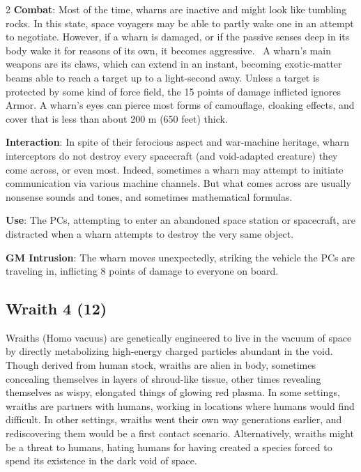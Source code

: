 \begin{multicols}{2}
\textbf{Combat}: Most of the time, wharns are inactive and might look like tumbling rocks. In this state, space voyagers may be able to partly wake one in an attempt to negotiate. However, if a wharn is damaged, or if the passive senses deep in its body wake it for reasons of its own, it becomes aggressive. 
A wharn’s main weapons are its claws, which can extend in an instant, becoming exotic-matter beams able to reach a target up to a light-second away. Unless a target is protected by some kind of force field, the 15 points of damage inflicted ignores Armor. A wharn’s eyes can pierce most forms of camouflage, cloaking effects, and cover that is less than about 200 m (650 feet) thick. 

\textbf{Interaction}: In spite of their ferocious aspect and war-machine heritage, wharn interceptors do not destroy every spacecraft (and void-adapted creature) they come across, or even most. Indeed, sometimes a wharn may attempt to initiate communication via various machine channels. But what comes across are usually nonsense sounds and tones, and sometimes mathematical formulas. 

\textbf{Use}: The PCs, attempting to enter an abandoned space station or spacecraft, are distracted when a wharn attempts to destroy the very same object.

\textbf{GM Intrusion}: The wharn moves unexpectedly, striking the vehicle the PCs are traveling in, inflicting 8 points of damage to everyone on board.

\subsection{Wraith 4 (12)}

Wraiths (Homo vacuus) are genetically engineered to live in the vacuum of space by directly metabolizing high-energy charged particles abundant in the void. Though derived from human stock, wraiths are alien in body, sometimes concealing themselves in layers of shroud-like tissue, other times revealing themselves as wispy, elongated things of glowing red plasma. In some settings, wraiths are partners with humans, working in locations where humans would find difficult. In other settings, wraiths went their own way generations earlier, and rediscovering them would be a first contact scenario. Alternatively, wraiths might be a threat to humans, hating humans for having created a species forced to spend its existence in the dark void of space.


\end{multicols}
